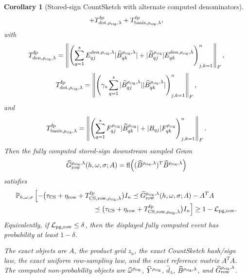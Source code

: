 \documentclass[11pt]{article}
\newcommand{\Prob}{\mathbb{P}}
\newcommand{\Frob}[1]{\left\lVert #1\right\rVert_F}
\newcommand{\fl}{\operatorname{fl}}
\newcommand{\I}{I}
\newtheorem{corollary}[theorem]{Corollary}
\theoremstyle{remark}
\begin{document}
\begin{corollary}[Stored-sign CountSketch with alternate computed denominators]
\[  +
  T_{{\rm dot},\rho_{\rm sig},\lambda}^{\rm fp}
  +
  T_{{\rm basis},\rho_{\rm sig},\lambda}^{\rm fp},
\]
with
\[
  T_{{\rm den},\rho_{\rm sig},\lambda}^{\rm fp}
  =
  \Frob{
    \left(
      \sum_{q=1}^{s}
      E^{{\rm den},\rho_{\rm sig},\lambda}_{qj}
        |\widehat B^{\rho_{\rm sig},\lambda}_{qk}|
      +
      |\widetilde B^{\rho_{\rm sig}}_{qj}|
        E^{{\rm den},\rho_{\rm sig},\lambda}_{qk}
    \right)_{j,k=1}^{n}
  },
\]
\[
  T_{{\rm dot},\rho_{\rm sig},\lambda}^{\rm fp}
  =
  \Frob{
    \left(
      \gamma_s\sum_{q=1}^{s}
      |\widehat B^{\rho_{\rm sig},\lambda}_{qj}|
      |\widehat B^{\rho_{\rm sig},\lambda}_{qk}|
    \right)_{j,k=1}^{n}
  },
\]
and
\[
  T_{{\rm basis},\rho_{\rm sig},\lambda}^{\rm fp}
  =
  \Frob{
    \left(
      \sum_{q=1}^{s}
      F^{\rho_{\rm sig}}_{qj}
        |\widetilde B^{\rho_{\rm sig}}_{qk}|
      +
      |B_{qj}|F^{\rho_{\rm sig}}_{qk}
    \right)_{j,k=1}^{n}
  }.
\]
Then the fully computed stored-sign downstream sampled Gram
\[
  \widehat G_{\rm row}^{\rho_{\rm sig},\lambda}(h,\omega,\sigma;A)
  =
  \fl\!\left(
    (\widehat B^{\rho_{\rm sig},\lambda})^T
    \widehat B^{\rho_{\rm sig},\lambda}
  \right)
\]
satisfies
\[
\begin{aligned}
&\Prob_{h,\omega,\sigma}
  \left[
    -\bigl(\tau_{\rm CS}+\eta_{\rm row}
      +T_{{\rm CS,row},\rho_{\rm sig},\lambda}^{\rm fp}\bigr)\I_n
    \preceq
    \widehat G_{\rm row}^{\rho_{\rm sig},\lambda}(h,\omega,\sigma;A)-A^TA
  \right.
\\[-2pt]
&\left.\hspace{4.0cm}
    \preceq
    \bigl(\tau_{\rm CS}+\eta_{\rm row}
      +T_{{\rm CS,row},\rho_{\rm sig},\lambda}^{\rm fp}\bigr)\I_n
  \right]
  \ge
  1-\mathcal L_{\rm pg,row}.
\end{aligned}
\]
Equivalently, if \(\mathcal L_{\rm pg,row}\le\delta\), then the displayed
fully computed event has probability at least \(1-\delta\).

The exact objects are \(A\), the product grid \(z_a\), the exact CountSketch
hash/sign law, the exact uniform row-sampling law, and the exact reference
matrix \(A^TA\).  The computed non-probability objects are
\(\widehat\omega^{\rho_{\rm sig}}\),
\(\widehat Y^{\rho_{\rm sig}}\), \(\widehat d_\lambda\),
\(\widehat B^{\rho_{\rm sig},\lambda}\), and
\(\widehat G_{\rm row}^{\rho_{\rm sig},\lambda}\).


\end{corollary}
\end{document}
